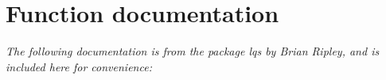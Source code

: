\documentclass{article}
\begin{document}
\newpage
\section{Function documentation}
\small














{\it The following documentation is from the package lqs by Brian Ripley,
and is included here for convenience:}


\end{document}
